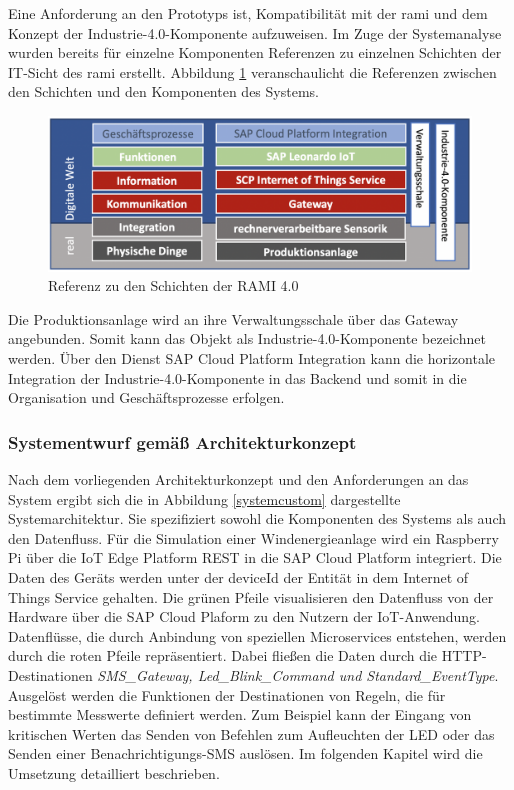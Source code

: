 Eine Anforderung an den Prototyps ist,  Kompatibilität mit der \ac{rami} und dem Konzept der Industrie-4.0-Komponente aufzuweisen. Im Zuge der Systemanalyse wurden bereits für einzelne Komponenten Referenzen zu einzelnen Schichten der IT-Sicht des \ac{rami} erstellt. Abbildung \ref{ramicustom} veranschaulicht die Referenzen zwischen den Schichten und den Komponenten des Systems.

\begin{figure}[H]
  \centering
  \includegraphics[width=1.0\linewidth]{pictures/ramicustom}
  \caption[Referenz zu den Schichten der RAMI 4.0]{Referenz zu den Schichten der RAMI 4.0}
  \label{ramicustom}
\end{figure}
 \noindent Die Produktionsanlage wird an ihre Verwaltungsschale über das Gateway angebunden. Somit kann das Objekt als Industrie-4.0-Komponente bezeichnet werden. Über den Dienst SAP Cloud Platform Integration kann die horizontale Integration der Industrie-4.0-Komponente in das Backend und somit in die Organisation und Geschäftsprozesse erfolgen.

\subsubsection{Systementwurf gemäß Architekturkonzept} \label{systementwurf}

Nach dem vorliegenden Architekturkonzept und den Anforderungen an das System ergibt sich die in Abbildung \ref{systemcustom} dargestellte Systemarchitektur. Sie spezifiziert sowohl die Komponenten des Systems als auch den Datenfluss. Für die Simulation einer Windenergieanlage wird ein Raspberry Pi über die IoT Edge Platform REST in die SAP Cloud Platform integriert. Die Daten des Geräts werden unter der deviceId der Entität in dem Internet of Things Service gehalten. Die grünen Pfeile visualisieren den Datenfluss von der Hardware über die SAP Cloud Plaform zu den Nutzern der IoT-Anwendung. Datenflüsse, die durch Anbindung von speziellen Microservices entstehen, werden durch die roten Pfeile repräsentiert. Dabei fließen die Daten durch die HTTP-Destinationen \textit{SMS\_Gateway, Led\_Blink\_Command und Standard\_EventType}. Ausgelöst werden die Funktionen der Destinationen von Regeln, die für bestimmte Messwerte definiert werden. Zum Beispiel kann der Eingang von kritischen Werten das Senden von Befehlen zum Aufleuchten der LED oder das Senden einer Benachrichtigungs-SMS auslösen. Im folgenden Kapitel wird die Umsetzung detailliert beschrieben.

